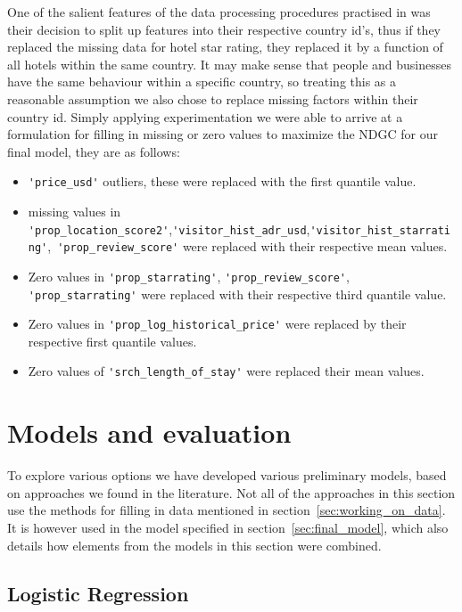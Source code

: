 \documentclass{llncs}
\begin{document}
	One of the salient features of the data processing procedures practised in \cite{DBLP:journals/corr/LiuXZYPLSW13} was their decision to split up features into their respective country id's, thus if they replaced the missing data for hotel star rating, they replaced it by a function of all hotels within the same country. It may make sense that people and businesses have the same behaviour within a specific country, so treating this as a reasonable assumption we also chose to replace missing factors within their country id. Simply applying experimentation we were able to arrive at a formulation for filling in missing or zero values to maximize the NDGC for our final model, they are as follows:
	\begin{itemize}
	\item \verb!'price_usd'! outliers, these were replaced with the first quantile value.
	\item missing values in \verb!'prop_location_score2'!,\verb!'visitor_hist_adr_usd!,\verb!'visitor_hist_starrating'!,\ \verb!'prop_review_score'! were replaced with their respective mean values. 
	\item Zero values in \verb!'prop_starrating'!, \verb!'prop_review_score'!, \verb!'prop_starrating'! were replaced with their respective third quantile value.
	\item Zero values in \verb!'prop_log_historical_price'! were replaced by their respective first quantile values. 
	\item Zero values of \verb!'srch_length_of_stay'! were replaced their mean values.
	\end{itemize}



\section{Models and evaluation}
To explore various options we have developed various preliminary models, based on approaches we found in the literature. Not all of the approaches in this section use the methods for filling in data mentioned in section~\ref{sec:working_on_data}. It is however used in the model specified in section~\ref{sec:final_model}, which also details how elements from the models in this section were combined.


\subsection{Logistic Regression}
\end{document}
